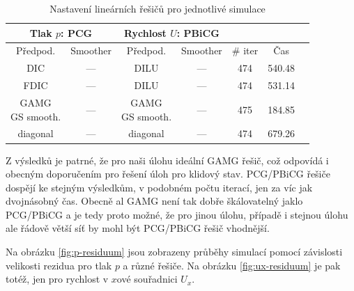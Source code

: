 \documentclass[a4paper,12pt]{report}
\theoremstyle{remark}
\begin{document}
\begin{table}[H]
\centering
\caption{Nastavení lineárních řešičů pro jednotlivé simulace}
\renewcommand{\arraystretch}{1.9}
\begin{tabular}{*7c}
\toprule	

\multicolumn{2}{c}{Tlak $p$: \textbf{PCG}} & \multicolumn{2}{c}{Rychlost $U$: \textbf{PBiCG}}\\		
\midrule
Předpod.&Smoother&Předpod.&Smoother&\# iter&Čas\\
\midrule
 DIC & --- &  DILU & --- &474&540.48\\								
FDIC & --- &  DILU & --- &474&531.14\\	
 \shortstack{GAMG\\GS smooth.}& --- &  \shortstack{GAMG\\GS smooth.}& --- &475&184.85\\	
diagonal & --- & diagonal & ---&474&679.26\\	

		\bottomrule
\end{tabular}

\label{table:solvers_PCG}

\end{table}

Z výsledků je patrné, že pro naši úlohu ideální GAMG řešič, což odpovídá i obecným doporučením pro řešení úloh pro klidový stav. PCG/PBiCG řešiče dospějí ke stejným výsledkům, v podobném počtu iterací, jen za víc jak dvojnásobný čas. Obecně al GAMG není tak dobře škálovatelný jaklo PCG/PBiCG a je tedy proto možné, že pro jinou úlohu, případě i stejnou úlohu ale řádově větší síť by mohl být PCG/PBiCG řešič vhodnější.

Na obrázku \ref{fig:p-residuum} jsou zobrazeny průběhy simulací pomocí závislosti velikosti rezidua pro tlak $p$ a různé řešiče. Na obrázku \ref{fig:ux-residuum} je pak totéž, jen pro rychlost v $x$ové souřadnici $U_x$.
\end{document}

